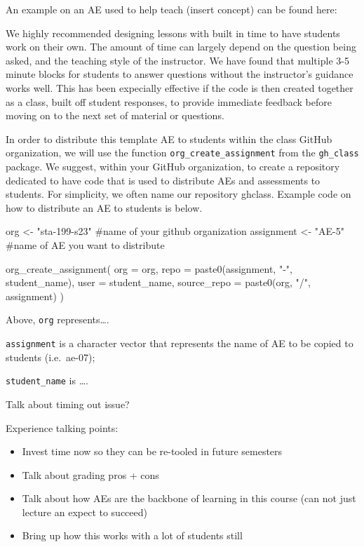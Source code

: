 \documentclass[
  12pt]{article}
\newenvironment{Shaded}{\begin{snugshade}}{\end{snugshade}}
\newcommand{\AttributeTok}[1]{\textcolor[rgb]{0.40,0.45,0.13}{#1}}
\newcommand{\CommentTok}[1]{\textcolor[rgb]{0.37,0.37,0.37}{#1}}
\newcommand{\FunctionTok}[1]{\textcolor[rgb]{0.28,0.35,0.67}{#1}}
\newcommand{\NormalTok}[1]{\textcolor[rgb]{0.00,0.23,0.31}{#1}}
\newcommand{\OtherTok}[1]{\textcolor[rgb]{0.00,0.23,0.31}{#1}}
\newcommand{\StringTok}[1]{\textcolor[rgb]{0.13,0.47,0.30}{#1}}
\begin{document}
An example on an AE used to help teach (insert concept) can be found
here:

We highly recommended designing lessons with built in time to have
students work on their own. The amount of time can largely depend on the
question being asked, and the teaching style of the instructor. We have
found that multiple 3-5 minute blocks for students to answer questions
without the instructor's guidance works well. This has been expecially
effective if the code is then created together as a class, built off
student responses, to provide immediate feedback before moving on to the
next set of material or questions.

In order to distribute this template AE to students within the class
GitHub organization, we will use the function
\texttt{org\_create\_assignment} from the \texttt{gh\_class} package. We
suggest, within your GitHub organization, to create a repository
dedicated to have code that is used to distribute AEs and assessments to
students. For simplicity, we often name our repository ghclass. Example
code on how to distribute an AE to students is below.

\begin{Shaded}
\begin{Highlighting}[]
\NormalTok{org }\OtherTok{\textless{}{-}} \StringTok{"sta{-}199{-}s23"} \CommentTok{\#name of your github organization}
\NormalTok{assignment }\OtherTok{\textless{}{-}} \StringTok{"AE{-}5"} \CommentTok{\#name of AE you want to distribute }

\FunctionTok{org\_create\_assignment}\NormalTok{(}
  \AttributeTok{org =}\NormalTok{ org,}
  \AttributeTok{repo =} \FunctionTok{paste0}\NormalTok{(assignment, }\StringTok{"{-}"}\NormalTok{, student\_name),}
  \AttributeTok{user =}\NormalTok{ student\_name,}
  \AttributeTok{source\_repo =} \FunctionTok{paste0}\NormalTok{(org, }\StringTok{"/"}\NormalTok{, assignment)}
\NormalTok{)}
\end{Highlighting}
\end{Shaded}

Above, \texttt{org} represents\ldots.

\texttt{assignment} is a character vector that represents the name of AE
to be copied to students (i.e.~ae-07);

\texttt{student\_name} is \ldots.

Talk about timing out issue?

Experience talking points:

\begin{itemize}
\item
  Invest time now so they can be re-tooled in future semesters
\item
  Talk about grading pros + cons
\item
  Talk about how AEs are the backbone of learning in this course (can
  not just lecture an expect to succeed)
\item
  Bring up how this works with a lot of students still
\end{itemize}
\end{document}
